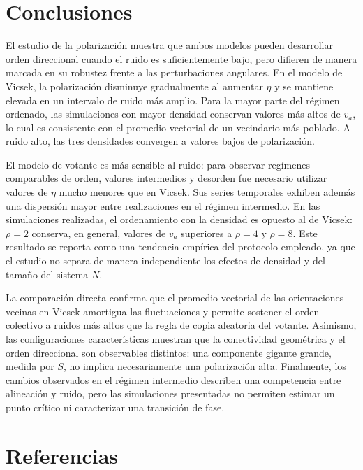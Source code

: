 \documentclass[11pt,a4paper]{article}
\begin{document}
\section{Conclusiones}

El estudio de la polarización muestra que ambos modelos pueden desarrollar orden direccional cuando el ruido es suficientemente bajo, pero difieren de manera marcada en su robustez frente a las perturbaciones angulares. En el modelo de Vicsek, la polarización disminuye gradualmente al aumentar $\eta$ y se mantiene elevada en un intervalo de ruido más amplio. Para la mayor parte del régimen ordenado, las simulaciones con mayor densidad conservan valores más altos de $v_a$, lo cual es consistente con el promedio vectorial de un vecindario más poblado. A ruido alto, las tres densidades convergen a valores bajos de polarización.

El modelo de votante es más sensible al ruido: para observar regímenes comparables de orden, valores intermedios y desorden fue necesario utilizar valores de $\eta$ mucho menores que en Vicsek. Sus series temporales exhiben además una dispersión mayor entre realizaciones en el régimen intermedio. En las simulaciones realizadas, el ordenamiento con la densidad es opuesto al de Vicsek: $\rho = 2$ conserva, en general, valores de $v_a$ superiores a $\rho = 4$ y $\rho = 8$. Este resultado se reporta como una tendencia empírica del protocolo empleado, ya que el estudio no separa de manera independiente los efectos de densidad y del tamaño del sistema $N$.

La comparación directa confirma que el promedio vectorial de las orientaciones vecinas en Vicsek amortigua las fluctuaciones y permite sostener el orden colectivo a ruidos más altos que la regla de copia aleatoria del votante. Asimismo, las configuraciones características muestran que la conectividad geométrica y el orden direccional son observables distintos: una componente gigante grande, medida por $S$, no implica necesariamente una polarización alta. Finalmente, los cambios observados en el régimen intermedio describen una competencia entre alineación y ruido, pero las simulaciones presentadas no permiten estimar un punto crítico ni caracterizar una transición de fase.

\section*{Referencias}
\end{document}
